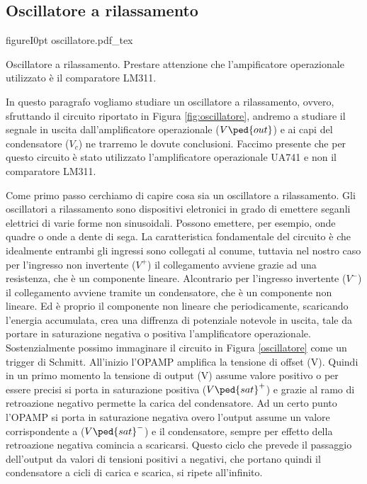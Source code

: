 \subsection*{Oscillatore a rilassamento}

\begin{wrapfloat}{figure}{I}{0pt}
        \def\svgwidth{0.45\textwidth}
        {oscillatore.pdf_tex}
        \caption{Oscillatore a rilassamento. Prestare attenzione che l'ampificatore operazionale utilizzato è il comparatore LM311.}
        \label{fig:oscillatore}
\end{wrapfloat}

In questo paragrafo vogliamo studiare un oscillatore a rilassamento, ovvero, sfruttando il circuito riportato in Figura \ref{fig:oscillatore}, andremo a studiare il segnale in uscita dall'amplificatore operazionale ($V\ped{out}$) e ai capi del condensatore ($V_c$) ne trarremo le dovute conclusioni. Faccimo presente che per questo circuito è stato utilizzato l'amplificatore operazionale UA741 e non il comparatore LM311.

Come primo passo cerchiamo di capire cosa sia un oscillatore a rilassamento. Gli oscillatori a rilassamento sono dispositivi eletronici in grado di emettere seganli elettrici di varie forme non sinusoidali. Possono emettere, per esempio, onde quadre o onde a dente di sega.
La caratteristica fondamentale del circuito è che idealmente entrambi gli ingressi sono collegati al conume, tuttavia nel nostro caso per l'ingresso non invertente ($V^+$) il collegamento avviene grazie ad una resistenza, che è un componente lineare. Alcontrario per l'ingresso invertente ($V^-$) il collegamento avviene tramite un condensatore, che è un componente non lineare. Ed è proprio il componente non lineare che periodicamente, scaricando l'energia accumulata, crea una diffrenza di potenziale notevole in uscita, tale da portare in saturazione negativa o positiva l'amplificatore operazionale.
Sostenzialmente possimo immaginare il circuito in Figura \ref{oscillatore} come un trigger di Schmitt. All'inizio l'OPAMP amplifica la tensione di offset (V). Quindi in un primo momento la tensione di output (V) assume valore positivo o per essere precisi si porta in saturazione positiva ($V\ped{sat}^+$) e grazie al ramo di retroazione negativo permette la carica del condensatore. Ad un certo punto l'OPAMP si porta in saturazione negativa overo l'output assume un valore corrispondente a ($V\ped{sat}^-$) e il condensatore, sempre per effetto della retroazione negativa comincia a scaricarsi. Questo ciclo che prevede il passaggio dell'output da valori di tensioni positivi a negativi, che portano quindi il condensatore a cicli di carica e scarica, si ripete all'infinito.

